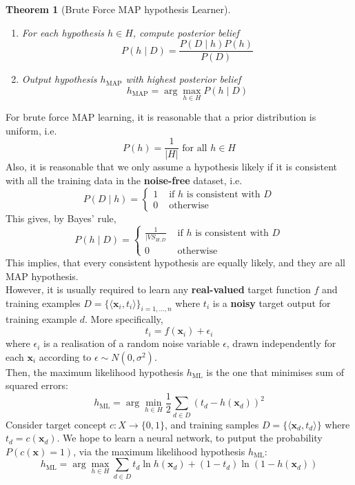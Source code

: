 \documentclass[12pt]{article}
\newtheorem{theorem}{Theorem}[section]
\theoremstyle{definition}
\begin{document}
\begin{theorem}[Brute Force MAP hypothesis Learner]
\hfill\\\normalfont \begin{enumerate}
\item For each hypothesis $h\in H$, compute posterior belief
\[
P(h\mid D)=\frac{P(D\mid h)P(h)}{P(D)}
\]
\item Output hypothesis $h_{\text{MAP}}$ with highest posterior belief
\[
h_{\text{MAP}}=\arg\max_{h\in H} P(h\mid D)
\]
\end{enumerate}
\end{theorem}
For brute force MAP learning, it is reasonable that a prior distribution is uniform, i.e.
\[
P(h)=\frac{1}{|H|}\text{  for all }h\in H
\]
Also, it is reasonable that we only assume a hypothesis likely if it is consistent with all the training data in the \textbf{noise-free} dataset, i.e.
\[
P(D\mid h)=\begin{cases}
1 & \text{ if }h\text{ is consistent with }D\\
0 & \text{ otherwise}
\end{cases}
\]
This gives, by Bayes' rule, 
\[
P(h\mid D)=\begin{cases}
\frac{1}{|VS_{H,D}} & \text{ if }h\text{ is consistent with }D\\
0 & \text{ otherwise}
\end{cases}
\]
This implies, that every consistent hypothesis are equally likely, and they are all MAP hypothesis.\\
However, it is usually required to learn any \textbf{real-valued} target function $f$ and training examples $D=\{\langle \mathbf{x}_i, t_i\rangle\}_{i=1,\ldots, n}$ where $t_i$ is a \textbf{noisy} target output for training example $d$. More specifically,
\[
t_i=f(\mathbf{x}_i)+\epsilon_i
\]
where $\epsilon_i$ is a realisation of a random noise variable $\epsilon$, drawn independently for each $\mathbf{x}_i$ according to $\epsilon\sim N(0, \sigma^2)$.\\
Then, the maximum likelihood hypothesis $h_{\text{ML}}$ is the one that minimises sum of squared errors:
\[
h_{\text{ML}}=\arg\min_{h\in H}\frac{1}{2}\sum_{d\in D}(t_d-h(\mathbf{x}_d))^2
\]
Consider target concept $c:X\to \{0,1\}$, and training samples $D=\{\langle \mathbf{x}_d, t_d\rangle\}$ where $t_d=c(\mathbf{x}_d)$. We hope to learn a neural network, to putput the probability $P(c(\mathbf{x})=1)$, via the maximum likelihood hypothesis $h_{\text{ML}}$:
\[
h_{\text{ML}}=\arg\max_{h\in H} \sum_{d\in D}t_d\ln h(\mathbf{x}_d)+(1-t_d)\ln(1-h(\mathbf{x}_d))
\]
\end{document}
